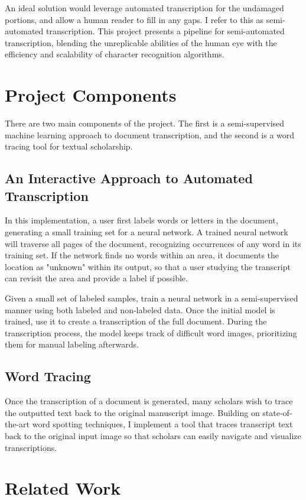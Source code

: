 \documentclass[final]{ukthesis}
\begin{document}
An ideal solution would leverage automated transcription for the undamaged portions, and allow a human reader to fill in any gaps. I refer to this as semi-automated transcription. This project presents a pipeline for semi-automated transcription, blending the unreplicable abilities of the human eye with the efficiency and scalability of character recognition algorithms.


\section{Project Components}
There are two main components of the project. The first is a semi-supervised machine learning approach to document transcription, and the second is a word tracing tool for textual scholarship.

\subsection{An Interactive Approach to Automated Transcription}
In this implementation, a user first labels words or letters in the document, generating a small training set for a neural network. A trained neural network will traverse all pages of the document, recognizing occurrences of any word in its training set. If the network finds no words within an area, it documents the location as "unknown" within its output, so that a user studying the transcript can revisit the area and provide a label if possible.

Given a small set of labeled samples, train a neural network in a semi-supervised manner using both labeled and non-labeled data. Once the initial model is trained, use it to create a transcription of the full document. During the transcription process, the model keeps track of difficult word images, prioritizing them for manual labeling afterwards.

\subsection{Word Tracing}
Once the transcription of a document is generated, many scholars wish to trace the outputted text back to the original manuscript image. Building on state-of-the-art word spotting techniques, I implement a tool that traces transcript text back to the original input image so that scholars can easily navigate and visualize transcriptions.



\section{Related Work}
\end{document}
